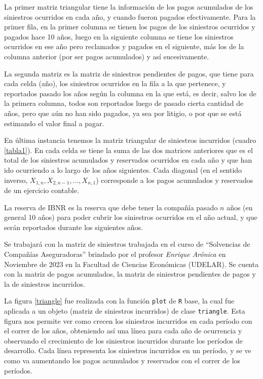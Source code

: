 \documentclass[
  12pt,
]{article}
\begin{document}
La primer matriz triangular tiene la información de los pagos acumulados
de los siniestros ocurridos en cada año, y cuando fueron pagados
efectivamente. Para la primer fila, en la primer columna se tienen los
pagos de los siniestros ocurridos y pagados hace 10 años, luego en la
siguiente columna se tiene los siniestros ocurridos en ese año pero
reclamados y pagados en el siguiente, más los de la columna anterior
(por ser pagos acumulados) y así sucesivamente.

La segunda matriz es la matriz de siniestros pendientes de pagos, que
tiene para cada celda (año), los siniestros ocurridos en la fila a la
que pertenece, y reportados pasado los años según la columna en la que
está, es decir, salvo los de la primera columna, todos son reportados
luego de pasado cierta cantidad de años, pero que aún no han sido
pagados, ya sea por litigio, o por que se está estimando el valor final
a pagar.

En última instancia tenemos la matriz triangular de siniestros
incurridos (cuadro \ref{tabla1}). En cada celda se tiene la suma de las
dos matrices anteriores que es el total de los siniestros acumulados y
reservados ocurridos en cada año y que han ido ocurriendo a lo largo de
los años siguientes. Cada diagonal (en el sentido inverso,
\(X_{1,n}, X_{2,n-1}, \ldots , X_{n,1}\)) corresponde a los pagos
acumulados y reservados de un ejercicio contable.

La reserva de IBNR es la reserva que debe tener la compañía pasado \(n\)
años (en general 10 años) para poder cubrir los siniestros ocurridos en
el año actual, y que serán reportados durante los siguientes años.

Se trabajará con la matriz de siniestros trabajada en el curso de
``Solvencias de Compañías Aseguradoras'' brindado por el profesor
\textit{Enrique Arónica} en Noviembre de 2023 en la Facultad de Ciencias
Económicas (UDELAR). Se cuenta con la matriz de pagos acumulados, la
matriz de siniestros pendientes de pagos y la de siniestros incurridos.

La figura \ref{triangle} fue realizada con la función \texttt{plot} de
\texttt{R} base, la cual fue aplicada a un objeto (matriz de siniestros
incurridos) de clase \texttt{triangle}. Esta figura nos permite ver como
crecen los siniestros incurridos en cada período con el correr de los
años, obteniendo así una línea para cada año de ocurrencia y observando
el crecimiento de los siniestros incurridos durante los períodos de
desarrollo. Cada línea representa los siniestros incurridos en un
período, y se ve como va aumentando los pagos acumulados y reservados
con el correr de los períodos.
\end{document}
